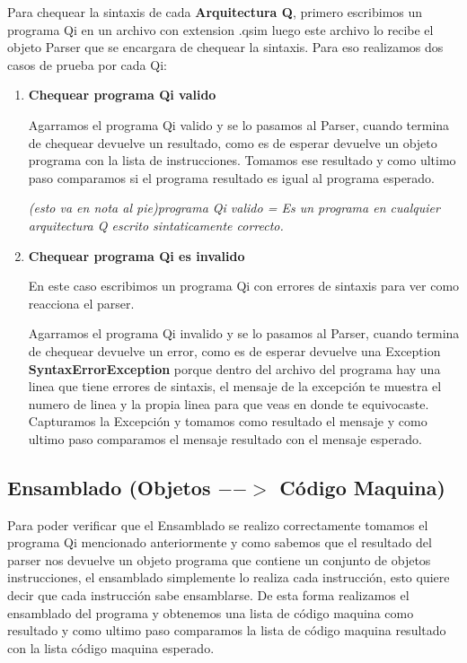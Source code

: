 Para chequear la sintaxis de cada \textbf{Arquitectura Q}, primero escribimos un programa Qi en un archivo con extension .qsim luego este archivo lo recibe el objeto Parser que se encargara de chequear la sintaxis. 
Para eso realizamos dos casos de prueba por cada Qi:
\begin{enumerate}
\item \textbf{Chequear programa Qi valido}

Agarramos el programa Qi valido y se lo pasamos al Parser, cuando termina de chequear devuelve un resultado, como es de esperar devuelve un objeto programa con la lista de instrucciones. Tomamos ese resultado y como ultimo paso comparamos si el programa resultado es igual al programa esperado.

\textit{ (esto va en nota al pie)programa Qi valido = Es un programa en cualquier arquitectura Q escrito sintaticamente correcto.}

\item \textbf{Chequear programa Qi es invalido} 

En este caso escribimos un programa Qi con errores de sintaxis para ver como reacciona el parser.

Agarramos el programa Qi invalido y se lo pasamos al Parser, cuando termina de chequear devuelve un error, como es de esperar devuelve una Exception \textbf{SyntaxErrorException} porque dentro del archivo del programa hay una linea que tiene errores de sintaxis, el mensaje de la excepción te muestra el numero de linea y la propia linea para que veas en donde te equivocaste. Capturamos la Excepción y tomamos como resultado el mensaje y como ultimo paso comparamos el mensaje resultado con el mensaje esperado.
\end{enumerate}

\subsection{Ensamblado (Objetos $-->$ Código Maquina)}

Para poder verificar que el Ensamblado se realizo correctamente tomamos el programa Qi mencionado anteriormente y como sabemos que el resultado del parser nos devuelve un objeto programa que contiene un conjunto de objetos instrucciones, el ensamblado simplemente lo realiza cada instrucción, esto quiere decir que cada instrucción sabe ensamblarse. De esta forma realizamos el ensamblado del programa y obtenemos una lista de código maquina como resultado y como ultimo paso comparamos la lista de código maquina resultado con la lista código maquina esperado.

